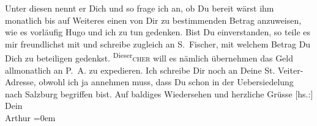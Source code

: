 \begin{ledgroupsized}[t]{13cm}
               Unter diesen nennt er Dich und so frage ich an, ob Du bereit wärst ihm monatlich bis
               auf Weiteres einen von Dir zu bestimmenden Betrag anzuweisen, wie es vorläufig Hugo und ich zu tun gedenken. Bist Du
               einverstanden, so teile es mir freundlichst mit und schreibe zugleich an S. Fischer, mit welchem Betrag Du Dich zu
               beteiligen ge{\pb}denkst. \substVorne{}\textsuperscript{Dieser}{\allowbreak}\substDazwischen{}\textsc{cher}\substHinten{} will es nämlich übernehmen das Geld allmonatlich an P. A. zu expedieren.\pend
           \pstart
           Ich schreibe Dir noch an Deine St. Veiter-Adresse,
               obwohl ich ja annehmen muss, dass Du schon in der Uebersiedelung nach Salzburg begriffen bist.\pend
           \pstart
           Auf baldiges Wiedersehen und herzliche Grüsse\pend
           \pstart
           {[}hs.:{]} Dein{\\[\baselineskip]}\spacefill\mbox{Arthur}\pend
           \leftskip=0em{}\endnumbering{}\end{ledgroupsized}  \newcommand{\dateiname}{L02099}\newcommand{\titel}{Arthur Schnitzler an Hermann Bahr, 16. 11. 1912}\newcommand{\editorInnen}{ Kurt Ifkovits,  Martin Anton Müller}
      